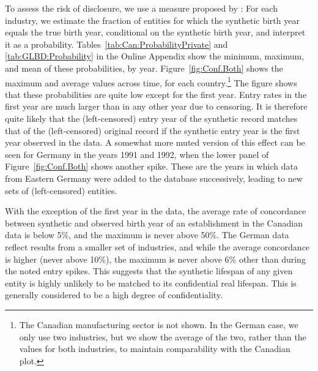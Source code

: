 \documentclass[10pt,twoside]{article}
\begin{document}
To assess the risk of disclosure, we use a measure proposed by \textcite{KinneyEtAl2011}: For each industry, we estimate the fraction of entities for which the synthetic birth year equals the true birth year, conditional on the synthetic birth year, and interpret it as a probability. Tables~\ref{tab:Can:ProbabilityPrivate} and \ref{tab:GLBD:Probability} in the Online Appendix show the minimum, maximum, and mean of these probabilities, by year. Figure~\ref{fig:Conf.Both} shows the maximum and average values across time, for each country.\footnote{The Canadian manufacturing sector is not shown. In the German case, we only use two industries, but we show the average of the two, rather than the values for both industries, to maintain comparability with the Canadian plot.} The figure shows that these probabilities are quite low except for the first year. Entry rates in the first year are much larger than in any other year due to censoring. It is therefore quite likely that the (left-censored) entry year of the synthetic record matches that of the (left-censored) original record if the synthetic entry year is the first year observed in the data. A somewhat more muted version of this effect can be seen for Germany in the years 1991 and 1992, when the lower panel of Figure~\ref{fig:Conf.Both} shows another spike. These are the years in which data from Eastern Germany were added to the database successively, leading to new sets of (left-censored) entities. 

With the exception of the first year in the data, the average rate of concordance between synthetic and observed birth year of an establishment in the Canadian data is below 5\%, and the maximum is never above 50\%. The German data reflect results from a smaller set of industries, and while the average concordance is higher (never above 10\%), the maximum is never above 6\% other than during the noted entry spikes. This suggests that the synthetic lifespan of any given entity is highly unlikely to be matched to its confidential real lifespan. This is generally considered to be a high degree of confidentiality. 
\end{document}
